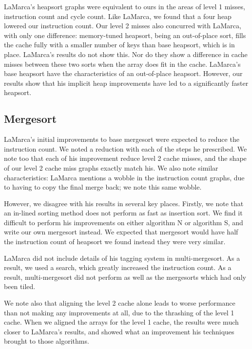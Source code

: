 LaMarca's heapsort graphs were equivalent to ours in the areas of level 1
misses, instruction count and cycle count. Like LaMarca, we found that a four
heap lowered our instruction count. Our level 2 misses also concurred with
LaMarca, with only one difference: memory-tuned heapsort, being an out-of-place sort,
fills the cache fully with a smaller number of keys than base heapsort, which is
in place. LaMarca's results do not show this. Nor do they show a difference in
cache misses between these two sorts when the array does fit in the cache.
LaMarca's base heapsort have the characteristics of an out-of-place heapsort.
However, our results show that his implicit heap improvements have led to a
significantly faster heapsort.

\subsection{Mergesort}

LaMarca's initial improvements to base mergesort were expected to reduce the
instruction count. We noted a reduction with each of the steps he prescribed. We
note too that each of his improvement reduce level 2 cache misses, and the shape
of our level 2 cache miss graphs exactly match his. We also note similar
characteristics: LaMarca mentions a wobble in the instruction count graphs, due to
having to copy the final merge back; we note this same wobble.

However, we disagree with his results in several key places. Firstly, we note
that an in-lined sorting method does not perform as fast as insertion sort. We
find it difficult to perform his improvements on either algorithm N or algorithm
S, and write our own mergesort instead. We expected that mergesort would have
half the instruction count of heapsort we found instead they were very similar.

LaMarca did not include details of his tagging system in multi-mergesort. As a
result, we used a search, which greatly increased the instruction count. As a
result, multi-mergesort did not perform as well as the mergesorts which had only
been tiled. 

We note also that aligning the level 2 cache alone leads to worse
performance than not making any improvements at all, due to the thrashing of the
level 1 cache. When we aligned the arrays for the level 1 cache, the results
were much closer to LaMarca's results, and showed what an improvement his
techniques brought to those algorithms.

